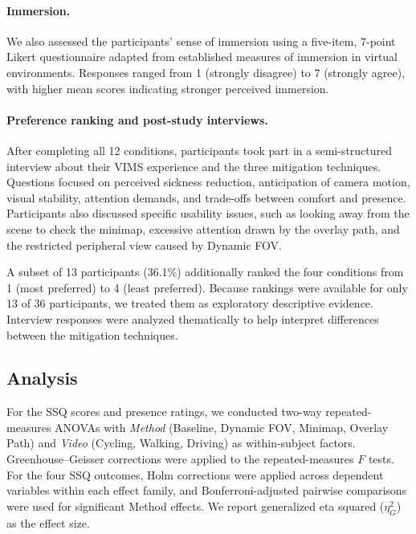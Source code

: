 \paragraph{Immersion.}
We also assessed the participants' sense of immersion using a five-item, 7-point Likert questionnaire adapted from established measures of immersion in virtual environments. Responses ranged from 1 (strongly disagree) to 7 (strongly agree), with higher mean scores indicating stronger perceived immersion. 


\paragraph{Preference ranking and post-study interviews.}

After completing all 12 conditions, participants took part in a semi-structured interview about their VIMS experience and the three mitigation techniques. Questions focused on perceived sickness reduction, anticipation of camera motion, visual stability, attention demands, and trade-offs between comfort and presence. Participants also discussed specific usability issues, such as looking away from the scene to check the minimap, excessive attention drawn by the overlay path, and the restricted peripheral view caused by Dynamic FOV.

A subset of 13 participants (36.1\%) additionally ranked the four conditions from 1 (most preferred) to 4 (least preferred). Because rankings were available for only 13 of 36 participants, we treated them as exploratory descriptive evidence. Interview responses were analyzed thematically to help interpret differences between the mitigation techniques.

\subsection{Analysis}

For the SSQ scores and presence ratings, we conducted two-way repeated-measures ANOVAs with \textit{Method} (Baseline, Dynamic FOV, Minimap, Overlay Path) and \textit{Video} (Cycling, Walking, Driving) as within-subject factors. Greenhouse--Geisser corrections were applied to the repeated-measures $F$ tests. For the four SSQ outcomes, Holm corrections were applied across dependent variables within each effect family, and Bonferroni-adjusted pairwise comparisons were used for significant Method effects. We report generalized eta squared ($\eta_G^2$) as the effect size.

